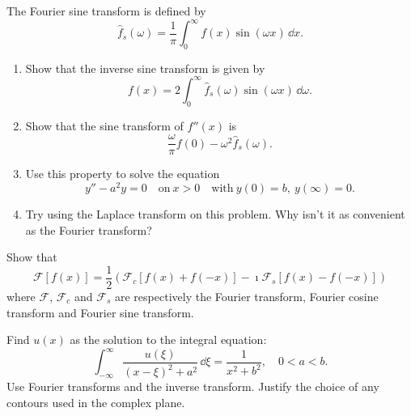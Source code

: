 {\begin{Exercise}
\end{Exercise}



\begin{Exercise}
  \label{exercise ode ft ifst f''}
  The Fourier sine transform is defined by
  \[
  \hat{f}_s(\omega) = \frac{1}{\pi} \int_0^\infty f(x) \sin(\omega x) \,\dd x.
  \]
  \begin{enumerate}
  \item 
    Show that  the inverse sine transform is given by
    \[
    f(x) = 2 \int_0^\infty \hat{f}_s(\omega) \sin(\omega x) \,\dd \omega.
    \]
  \item  
    Show that the sine transform of $f''(x)$ is
    \[
    \frac{\omega}{\pi} f(0) - \omega^2 \hat{f}_s(\omega).
    \]
  \item  
    Use this property to solve the equation 
    \[
    y'' - a^2 y = 0 \quad \mathrm{on}\ x > 0 
    \quad \mathrm{with}\ y(0) = b,\ y(\infty) = 0.
    \]
  \item  
    Try using the Laplace transform on this problem. Why isn't it as 
    convenient as the Fourier transform?
  \end{enumerate}

\end{Exercise}





\begin{Exercise}
  \label{exercise ode ft ft fct fst}
  Show that
  \[
  \mathcal{F}[f(x)] = \frac{1}{2} \left( 
    \mathcal{F}_c [f(x) + f(-x)] -\imath \mathcal{F}_s [f(x) - f(-x)] \right)
  \]
  where $\mathcal{F}$, $\mathcal{F}_c$ and $\mathcal{F}_s$ are respectively
  the Fourier transform, Fourier cosine transform and Fourier sine transform.

\end{Exercise}





\begin{Exercise}
  \label{exercise ode ft int eqn int=1/(x2+b2)}
  Find $u(x)$ as the solution to the integral equation:
  \[
  \int_{-\infty}^\infty \frac{u(\xi)}{ (x-\xi)^2 + a^2 } \,\dd \xi
  = \frac{1}{x^2 + b^2}, \quad 0 < a < b.
  \]
  Use Fourier transforms and the inverse transform.  Justify the choice of any
  contours used in the complex plane.

\end{Exercise}






\raggedbottom
}
